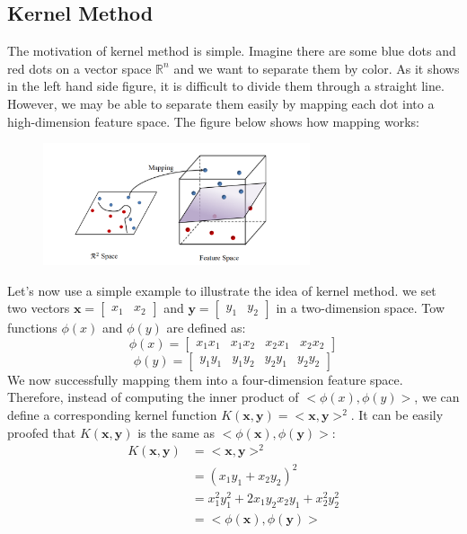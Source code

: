 \subsection{Kernel Method}
The motivation of kernel method is simple. Imagine there are some blue dots and red dots on a vector space $\mathbb{R}^n$ and 
we want to separate them by color. As it shows in the left hand side figure, it is difficult to divide them through a straight 
line. However, we may be able to separate them easily by mapping each dot into a high-dimension feature space. The figure below 
shows how mapping works:
\begin{figure}[H]
    \centering
    \includegraphics[width=0.7\textwidth]{Mapping}
\end{figure}
Let's now use a simple example to illustrate the idea of kernel method. 
we set two vectors $\textbf{x}=\begin{bmatrix}x_1&x_2\end{bmatrix}$ and $\textbf{y}=\begin{bmatrix}y_1&y_2\end{bmatrix}$ in a two-dimension space.
Tow functions $\phi(x)$ and $\phi(y)$ are defined as:
\begin{equation*}
    \phi(x)=\begin{bmatrix}
        x_1x_1&x_1x_2&x_2x_1&x_2x_2
    \end{bmatrix}
\end{equation*}
\begin{equation*}
    \phi(y)=\begin{bmatrix}
        y_1y_1&y_1y_2&y_2y_1&y_2y_2
    \end{bmatrix}
\end{equation*}
We now successfully mapping them into a four-dimension feature space. Therefore, instead of computing the inner product of $<\phi(x),\phi(y)>$, we can define 
a corresponding kernel function $K(\textbf{x},\textbf{y})=<\textbf{x},\textbf{y}>^2$. It can be easily proofed that $K(\textbf{x},\textbf{y})$ is the same as $<\phi(\textbf{x}),\phi(\textbf{y})>$:
\begin{align*}
    K(\textbf{x},\textbf{y})&=<\textbf{x},\textbf{y}>^2\\
                            &=(x_1y_1+x_2y_2)^2\\
                            &=x_1^2y_1^2+2x_1y_2x_2y_1+x_2^2y_2^2\\
                            &=<\phi(\textbf{x}),\phi(\textbf{y})>
\end{align*}
